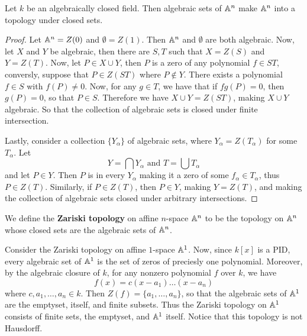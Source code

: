 \begin{lemma}\label{lemma_1.1.1}
    Let $k$ be an algebraically closed field. Then algebraic sets of $\mathbb{A}^n$ make
     $\mathbb{A}^n$ into a topology under closed sets.
\end{lemma}
\begin{proof}
    Let $\mathbb{A}^n=Z(0)$ and $\emptyset=Z(1)$. Then $\mathbb{A}^n$ and $\emptyset$ are both
    algebraic. Now, let  $X$ and  $Y$ be algebraic, then there are $S,T$ such
    that  $X=Z(S)$ and $Y=Z(T)$. Now, let $P \in X \cup Y$, then $P$ is a zero
    of any polynomial $f \in ST$, conversly, suppose that $P \in Z(ST)$ where $P
    \notin Y$. There exists a polynomial  $f \in S$ with $f(P) \neq 0$. Now, for
    any $g \in T$, we have that if $fg(P)=0$, then $g(P)=0$, so that $P \in S$.
    Therefore we have  $X \cup Y=Z(ST)$, making $X \cup Y$ algebraic. So that
    the collection of algebraic sets is closed under finite intersection.

    Lastly, consider a collection $\{Y_\alpha\}$ of algebraic sets, where
    $Y_\alpha=Z(T_\alpha)$ for some $T_\alpha$. Let
    \begin{equation*}
        Y=\bigcap{Y_\alpha} \text{ and } T=\bigcup{T_\alpha}
    \end{equation*}
    and let $P \in Y$. Then $P$ is in every $Y_\alpha$ making it a zero of some
    $f_\alpha \in T_\alpha$, thus  $P \in Z(T)$. Similarly, if $P \in Z(T)$, then
    $P \in Y$, making $Y=Z(T)$, and making the collection of algebraic sets
    closed under arbitrary intersections.
\end{proof}

\begin{definition}
    We define the \textbf{Zariski topology} on affine $n$-space  $\mathbb{A}^n$ to be
    the topology on $\mathbb{A}^n$ whose closed sets are the algebraic sets of $\mathbb{A}^n$.
\end{definition}

\begin{example}\label{example_1.2}
    Consider the Zariski topology on affine $1$-space  $\mathbb{A}^1$. Now, since $k[x]$
    is a PID,  every algebraic set of $\mathbb{A}^1$ is the set of zeros of preciesly
    one polynomial. Moreover, by the algebraic closure of  $k$, for any nonzero
    polynomial  $f$ over  $k$, we have
    \begin{equation*}
        f(x)=c(x-a_1) \dots (x-a_n)
    \end{equation*}
    where $c,a_1, \dots, a_n \in k$. Then $Z(f)=\{a_1, \dots, a_n\}$, so that
    the algebraic sets of $\mathbb{A}^1$ are the emptyset, itself, and finite subsets.
    Thus the Zariski topology on  $\mathbb{A}^1$ consists of finite sets, the emptyset,
    and $\mathbb{A}^1$ itself. Notice that this topology is not Hausdorff.
\end{example}

